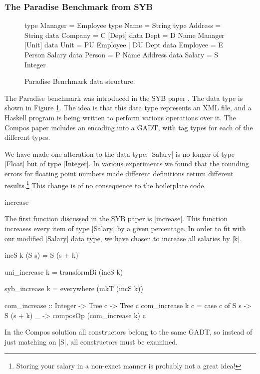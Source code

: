 \subsubsection{The Paradise Benchmark from SYB}

\begin{figure}
\begin{code}
type  Manager   = Employee
type  Name      = String
type  Address   = String
data  Company   = C [Dept]
data  Dept      = D Name Manager [Unit]
data  Unit      = PU Employee | DU Dept
data  Employee  = E Person Salary
data  Person    = P Name Address
data  Salary    = S Integer
\end{code}
\caption{Paradise Benchmark data structure.}
\label{fig:paradise}
\end{figure}

The Paradise benchmark was introduced in the SYB paper \citep{lammel:syb}. The data type is shown in Figure \ref{fig:paradise}. The idea is that this data type represents an XML file, and a Haskell program is being written to perform various operations over it. The Compos paper includes an encoding into a GADT, with tag types for each of the different types.

We have made one alteration to the data type: |Salary| is no longer of type |Float| but of type |Integer|. In various experiments we found that the rounding errors for floating point numbers made different definitions return different results.\footnote{Storing your salary in a non-exact manner is probably not a great idea!} This change is of no consequence to the boilerplate code.

\begin{examplename}{increase}

The first function discussed in the SYB paper is |increase|. This function increases every item of type |Salary| by a given percentage. In order to fit with our modified |Salary| data type, we have chosen to increase all salaries by |k|.

\ignore\begin{code}
incS k (S s) = S (s + k)

uni_increase k = transformBi (incS k)

syb_increase k = everywhere (mkT (incS k))

com_increase :: Integer -> Tree c -> Tree c
com_increase k c = case c of
    S s -> S (s + k)
    _ -> composOp (com_increase k) c
\end{code}

In the Compos solution all constructors belong to the same GADT, so instead of just matching on |S|, all constructors must be examined.
\end{examplename}

